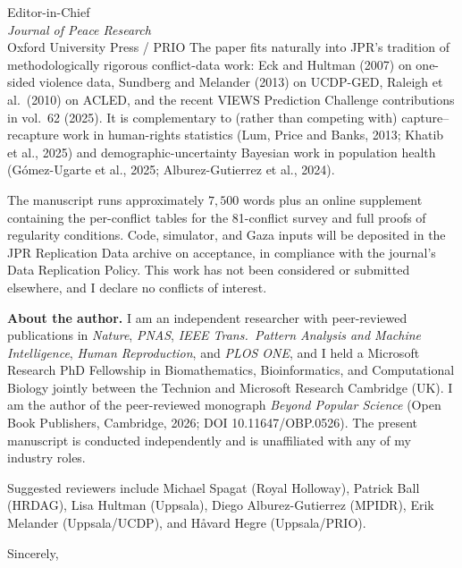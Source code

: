 \documentclass[11pt]{letter}
\begin{document}
\begin{letter}{Editor-in-Chief\\ \emph{Journal of Peace Research}\\ Oxford University Press / PRIO}
The paper fits naturally into JPR's tradition of methodologically rigorous conflict-data work: Eck and Hultman (2007) on one-sided violence data, Sundberg and Melander (2013) on UCDP-GED, Raleigh et al.\ (2010) on ACLED, and the recent VIEWS Prediction Challenge contributions in vol.~62 (2025). It is complementary to (rather than competing with) capture--recapture work in human-rights statistics (Lum, Price and Banks, 2013; Khatib et al., 2025) and demographic-uncertainty Bayesian work in population health (G\'{o}mez-Ugarte et al., 2025; Alburez-Gutierrez et al., 2024).

The manuscript runs approximately $7{,}500$ words plus an online supplement containing the per-conflict tables for the 81-conflict survey and full proofs of regularity conditions. Code, simulator, and Gaza inputs will be deposited in the JPR Replication Data archive on acceptance, in compliance with the journal's Data Replication Policy. This work has not been considered or submitted elsewhere, and I declare no conflicts of interest.

\textbf{About the author.} I am an independent researcher with peer-reviewed publications in \emph{Nature}, \emph{PNAS}, \emph{IEEE Trans.\ Pattern Analysis and Machine Intelligence}, \emph{Human Reproduction}, and \emph{PLOS ONE}, and I held a Microsoft Research PhD Fellowship in Biomathematics, Bioinformatics, and Computational Biology jointly between the Technion and Microsoft Research Cambridge (UK). I am the author of the peer-reviewed monograph \emph{Beyond Popular Science} (Open Book Publishers, Cambridge, 2026; DOI 10.11647/OBP.0526). The present manuscript is conducted independently and is unaffiliated with any of my industry roles.

Suggested reviewers include Michael Spagat (Royal Holloway), Patrick Ball (HRDAG), Lisa Hultman (Uppsala), Diego Alburez-Gutierrez (MPIDR), Erik Melander (Uppsala/UCDP), and H{\aa}vard Hegre (Uppsala/PRIO).

\closing{Sincerely,}

\end{letter}
\end{document}
